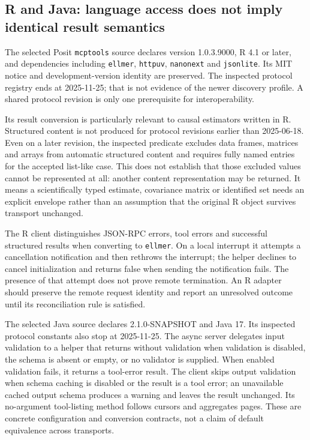 \subsection{R and Java: language access does not imply identical result semantics}

The selected Posit \texttt{mcptools} source declares version 1.0.3.9000,
R 4.1 or later, and dependencies including \texttt{ellmer}, \texttt{httpuv},
\texttt{nanonext} and \texttt{jsonlite}. Its MIT notice and development-version
identity are preserved. The inspected protocol registry ends at 2025-11-25;
that is not evidence of the newer discovery profile. A shared protocol
revision is only one prerequisite for interoperability.
\citep{exec24_mcp_r}

Its result conversion is particularly relevant to causal estimators written
in R. Structured content is not produced for protocol revisions earlier than
2025-06-18. Even on a later revision, the inspected predicate excludes data
frames, matrices and arrays from automatic structured content and requires
fully named entries for the accepted list-like case. This does not establish
that those excluded values cannot be represented at all: another content
representation may be returned. It means a scientifically typed estimate,
covariance matrix or identified set needs an explicit envelope rather than
an assumption that the original R object survives transport unchanged.
\citep{exec24_mcp_r}

The R client distinguishes JSON-RPC errors, tool errors and successful
structured results when converting to \texttt{ellmer}. On a local interrupt
it attempts a cancellation notification and then rethrows the interrupt;
the helper declines to cancel initialization and returns false when sending
the notification fails. The presence of that attempt does not prove remote
termination. An R adapter should preserve the remote request identity and
report an unresolved outcome until its reconciliation rule is satisfied.
\citep{exec24_mcp_r,exec24_mcp_contracts}

The selected Java source declares 2.1.0-SNAPSHOT and Java 17. Its inspected
protocol constants also stop at 2025-11-25. The async server delegates input
validation to a helper that returns without validation when validation is
disabled, the schema is absent or empty, or no validator is supplied. When
enabled validation fails, it returns a tool-error result. The client skips
output validation when schema caching is disabled or the result is a tool
error; an unavailable cached output schema produces a warning and leaves
the result unchanged. Its no-argument tool-listing method follows cursors
and aggregates pages. These are concrete configuration and conversion
contracts, not a claim of default equivalence across transports.
\citep{exec24_mcp_java}

